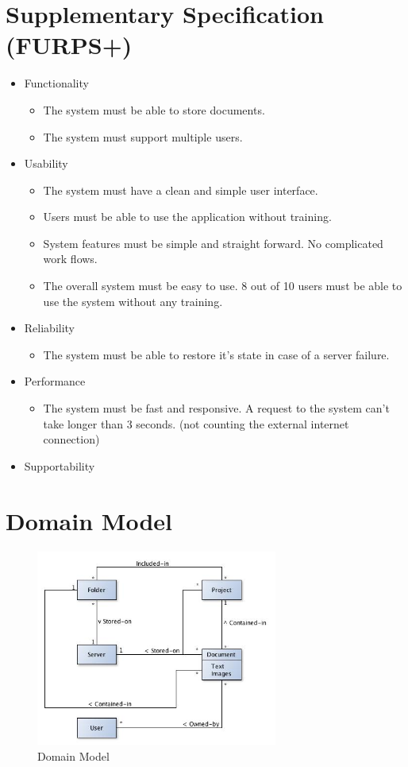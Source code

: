 \documentclass[11pt,a4paper]{article}
\begin{document}
\section{Supplementary Specification (FURPS+)}
\begin{itemize}
\item Functionality
	\begin{itemize}
	\item The system must be able to store documents.
	\item The system must support multiple users.
	\end{itemize}
\item Usability
	\begin{itemize}
	\item The system must have a clean and simple user interface.
	\item Users must be able to use the application without training.
	\item System features must be simple and straight forward. No complicated work flows.
	\item The overall system must be easy to use. 8 out of 10 users must be able to use the system without any training.
	\end{itemize}
\item Reliability
	\begin{itemize}
	\item The system must be able to restore it's state in case of a server failure.
	\end{itemize}
\item Performance
	\begin{itemize}
	\item The system must be fast and responsive. A request to the system can't take longer than 3 seconds. (not counting the external internet connection)
	\end{itemize}
\item Supportability
\end{itemize}

\section{Domain Model}
	\begin{figure}[h]
  		\centering
    	\includegraphics[width=300px]{images/DomainModel.jpg}
    	\caption{Domain Model}
	\end{figure}
	
\end{document}
